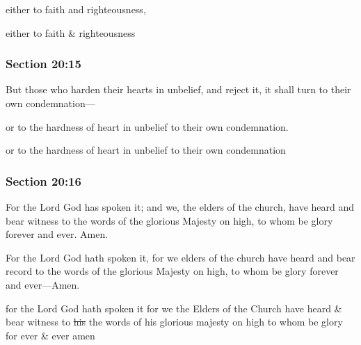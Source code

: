 		\begin{framed}
		\scriptsize
			\begin{compactdesc}
				\item[JSP] either to faith and righteousness,
				\item[RB1] either to faith \& righteousness
			\end{compactdesc}
		\end{framed}

	\subsubsection{Section 20:15} %
		\label{DC20-15}

		But those who harden their hearts in unbelief, and reject it, it shall turn to their own condemnation---

		\begin{framed}
		\scriptsize
			\begin{compactdesc}
				\item[JSP] or to the hardness of heart in unbelief to their own condemnation.
				\item[RB1] or to the hardness of heart in unbelief to their own condemnation
			\end{compactdesc}
		\end{framed}

	\subsubsection{Section 20:16} %
		\label{DC20-16}

		For the Lord God has spoken it; and we, the elders of the church, have heard and bear witness to the words of the glorious Majesty on high, to whom be glory forever and ever. Amen.

		\begin{framed}
		\scriptsize
			\begin{compactdesc}
				\item[JSP] For the Lord God hath spoken it, for we elders of the church have heard and bear record to the words of the glorious Majesty on high, to whom be glory forever and ever---Amen.
				\item[RB1] for the Lord God hath spoken it for we the Elders of the Church have heard \& bear witness to \sout{his} the words of his glorious majesty on high to whom be glory for ever \& ever amen
			\end{compactdesc}
		\end{framed}

